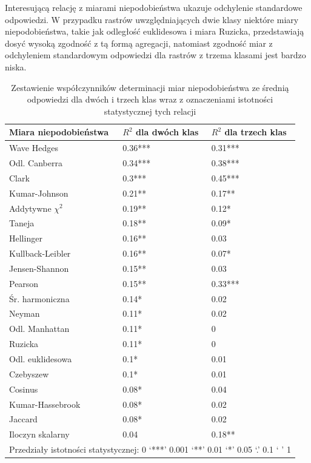 \documentclass{amuthesis}
\begin{document}
Interesującą relację z miarami niepodobieństwa ukazuje odchylenie
standardowe odpowiedzi. W przypadku rastrów uwzględniających dwie klasy
niektóre miary niepodobieństwa, takie jak odległość euklidesowa i miara
Ruzicka, przedstawiają dosyć wysoką zgodność z tą formą agregacji,
natomiast zgodność miar z odchyleniem standardowym odpowiedzi dla
rastrów z trzema klasami jest bardzo niska.

\hypertarget{tbl-corr_table_fixed}{}
\begin{table}
\caption{\label{tbl-corr_table_fixed}Zestawienie współczynników determinacji miar niepodobieństwa ze średnią
odpowiedzi dla dwóch i trzech klas wraz z oznaczeniami istotności
statystycznej tych relacji }\tabularnewline

\centering
\begin{tabular}{lll}
\toprule
Miara niepodobieństwa & $R^2$ dla dwóch klas & $R^2$ dla trzech klas\\
\midrule
Wave Hedges & 0.36*** & 0.31***\\
Odl. Canberra & 0.34*** & 0.38***\\
Clark & 0.3*** & 0.45***\\
Kumar-Johnson & 0.21** & 0.17**\\
Addytywne $\chi^2$ & 0.19** & 0.12*\\
\addlinespace
Taneja & 0.18** & 0.09*\\
Hellinger & 0.16** & 0.03\\
Kullback-Leibler & 0.16** & 0.07*\\
Jensen-Shannon & 0.15** & 0.03\\
Pearson & 0.15** & 0.33***\\
\addlinespace
Śr. harmoniczna & 0.14* & 0.02\\
Neyman & 0.11* & 0.02\\
Odl. Manhattan & 0.11* & 0\\
Ruzicka & 0.11* & 0\\
Odl. euklidesowa & 0.1* & 0.01\\
\addlinespace
Czebyszew & 0.1* & 0.01\\
Cosinus & 0.08* & 0.04\\
Kumar-Hassebrook & 0.08* & 0.02\\
Jaccard & 0.08* & 0.02\\
Iloczyn skalarny & 0.04 & 0.18**\\
\bottomrule
\multicolumn{3}{l}{\rule{0pt}{1em}Przedziały istotności statystycznej:  0 ‘***’ 0.001 ‘**’ 0.01 ‘*’ 0.05 ‘.’ 0.1 ‘ ’ 1}\\
\end{tabular}
\end{table}
\end{document}
